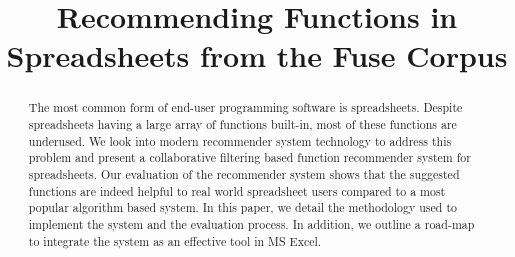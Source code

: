 \documentclass[conference]{IEEEtran}
\begin{document}
%
\title{Recommending Functions in Spreadsheets from the Fuse Corpus}


\author{
}


% 



\maketitle


\begin{abstract}
The most common form of end-user programming software is spreadsheets. Despite spreadsheets having a large array of functions built-in, most of these functions are underused. We look into modern recommender system technology to address this problem and present a collaborative filtering based function recommender system for spreadsheets. Our evaluation of the recommender system shows that the suggested functions are indeed helpful to real world spreadsheet users compared to a most popular algorithm based system. In this paper, we detail the methodology used to implement the system and the evaluation process. In addition, we outline a road-map to integrate the system as an effective tool in MS Excel.
\end{abstract}
\end{document}
